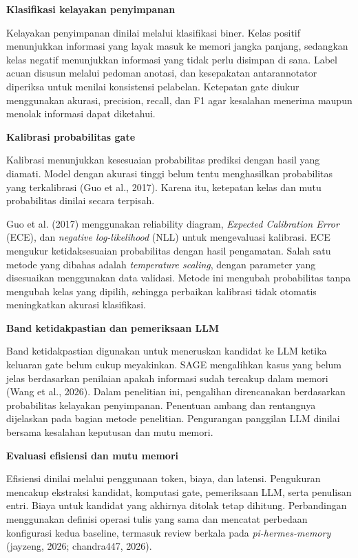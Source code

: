 \documentclass[
]{article}
\begin{document}
\textbf{Klasifikasi kelayakan penyimpanan}

Kelayakan penyimpanan dinilai melalui klasifikasi biner. Kelas positif menunjukkan informasi yang layak masuk ke memori jangka panjang, sedangkan kelas negatif menunjukkan informasi yang tidak perlu disimpan di sana. Label acuan disusun melalui pedoman anotasi, dan kesepakatan antarannotator diperiksa untuk menilai konsistensi pelabelan. Ketepatan gate diukur menggunakan akurasi, precision, recall, dan F1 agar kesalahan menerima maupun menolak informasi dapat diketahui.

\textbf{Kalibrasi probabilitas gate}

Kalibrasi menunjukkan kesesuaian probabilitas prediksi dengan hasil yang diamati. Model dengan akurasi tinggi belum tentu menghasilkan probabilitas yang terkalibrasi (Guo et al., 2017). Karena itu, ketepatan kelas dan mutu probabilitas dinilai secara terpisah.

Guo et al. (2017) menggunakan reliability diagram, \emph{Expected Calibration Error} (ECE), dan \emph{negative log-likelihood} (NLL) untuk mengevaluasi kalibrasi. ECE mengukur ketidaksesuaian probabilitas dengan hasil pengamatan. Salah satu metode yang dibahas adalah \emph{temperature scaling}, dengan parameter yang disesuaikan menggunakan data validasi. Metode ini mengubah probabilitas tanpa mengubah kelas yang dipilih, sehingga perbaikan kalibrasi tidak otomatis meningkatkan akurasi klasifikasi.

\textbf{Band ketidakpastian dan pemeriksaan LLM}

Band ketidakpastian digunakan untuk meneruskan kandidat ke LLM ketika keluaran gate belum cukup meyakinkan. SAGE mengalihkan kasus yang belum jelas berdasarkan penilaian apakah informasi sudah tercakup dalam memori (Wang et al., 2026). Dalam penelitian ini, pengalihan direncanakan berdasarkan probabilitas kelayakan penyimpanan. Penentuan ambang dan rentangnya dijelaskan pada bagian metode penelitian. Pengurangan panggilan LLM dinilai bersama kesalahan keputusan dan mutu memori.

\textbf{Evaluasi efisiensi dan mutu memori}

Efisiensi dinilai melalui penggunaan token, biaya, dan latensi. Pengukuran mencakup ekstraksi kandidat, komputasi gate, pemeriksaan LLM, serta penulisan entri. Biaya untuk kandidat yang akhirnya ditolak tetap dihitung. Perbandingan menggunakan definisi operasi tulis yang sama dan mencatat perbedaan konfigurasi kedua baseline, termasuk review berkala pada \emph{pi-hermes-memory} (jayzeng, 2026; chandra447, 2026).
\end{document}
